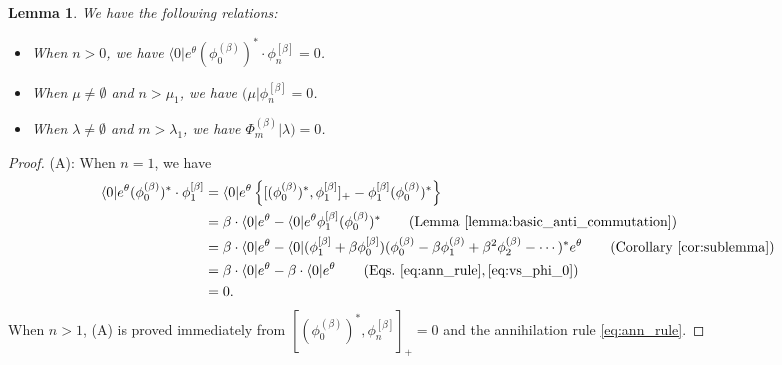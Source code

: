\documentclass{amsart}
\newtheorem{lemma}[thm]{Lemma}
\def\bra#1{\langle #1 \vert}
\def\mket#1{\vert #1 )}
\def\mbra#1{( #1 \vert}
\begin{document}
\begin{lemma}\label{lemma:hojyo_1}
We have the following relations:
\begin{itemize}
\item[(A)]
When $n>0$, we have $\bra{0}e^{\theta}(\phi_0^{(\beta)})^\ast\cdot \phi^{[\beta]}_n=0$.
\item[(B)]
When $\mu\neq \emptyset$ and $n>\mu_1$, we have $\mbra{\mu}\phi^{[\beta]}_n=0$.
\item[(C)]
When $\lambda\neq \emptyset$ and $m>\lambda_1$, we have
$\Phi^{(\beta)}_m\mket{\lambda}=0$.
\end{itemize}
\end{lemma}
\begin{proof}
(A):
When $n=1$, we have 
\begin{align*}
\bra{0}e^{\theta}(\phi_0^{(\beta)})^\ast\cdot \phi^{[\beta]}_1
&=
\bra{0}e^{\theta}\left\{
[(\phi_0^{(\beta)})^\ast,\phi^{[\beta]}_1 ]_+-\phi^{[\beta]}_1(\phi_0^{(\beta)})^\ast
\right\}\\
&
=
\beta\cdot \bra{0}e^{\theta}-\bra{0}e^{\theta}\phi^{[\beta]}_1(\phi^{(\beta)}_0)^\ast
\qquad (\mathrm{Lemma\   \ref{lemma:basic_anti_commutation}})\\
&
=
\beta\cdot \bra{0}e^{\theta}-\bra{0}(\phi^{[\beta]}_1+\beta \phi^{[\beta]}_0)(\phi^{(\beta)}_0-\beta\phi^{(\beta)}_1+\beta^2\phi^{(\beta)}_2-\cdots)^\ast e^\theta
\qquad (\text{Corollary~\ref{cor:sublemma}})
\\
&=
\beta\cdot \bra{0}e^{\theta}-
\beta\cdot \bra{0}e^{\theta}\qquad (\mathrm{Eqs.~\eqref{eq:ann_rule},\eqref{eq:vs_phi_0}} )\\
&=0.
\end{align*}
When $n>1$, (A) is proved immediately from $[(\phi^{(\beta)}_0)^\ast,\phi^{[\beta]}_n]_+=0$ and the annihilation rule \eqref{eq:ann_rule}.


\end{proof}
\end{document}
